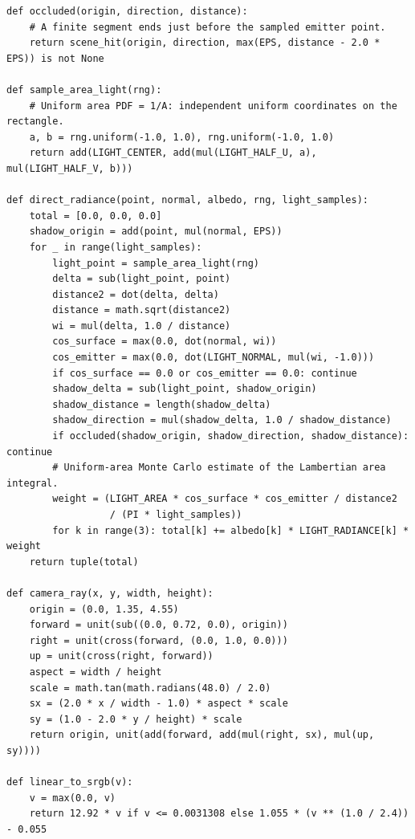 \begin{verbatim}
def occluded(origin, direction, distance):
    # A finite segment ends just before the sampled emitter point.
    return scene_hit(origin, direction, max(EPS, distance - 2.0 * EPS)) is not None

def sample_area_light(rng):
    # Uniform area PDF = 1/A: independent uniform coordinates on the rectangle.
    a, b = rng.uniform(-1.0, 1.0), rng.uniform(-1.0, 1.0)
    return add(LIGHT_CENTER, add(mul(LIGHT_HALF_U, a), mul(LIGHT_HALF_V, b)))

def direct_radiance(point, normal, albedo, rng, light_samples):
    total = [0.0, 0.0, 0.0]
    shadow_origin = add(point, mul(normal, EPS))
    for _ in range(light_samples):
        light_point = sample_area_light(rng)
        delta = sub(light_point, point)
        distance2 = dot(delta, delta)
        distance = math.sqrt(distance2)
        wi = mul(delta, 1.0 / distance)
        cos_surface = max(0.0, dot(normal, wi))
        cos_emitter = max(0.0, dot(LIGHT_NORMAL, mul(wi, -1.0)))
        if cos_surface == 0.0 or cos_emitter == 0.0: continue
        shadow_delta = sub(light_point, shadow_origin)
        shadow_distance = length(shadow_delta)
        shadow_direction = mul(shadow_delta, 1.0 / shadow_distance)
        if occluded(shadow_origin, shadow_direction, shadow_distance): continue
        # Uniform-area Monte Carlo estimate of the Lambertian area integral.
        weight = (LIGHT_AREA * cos_surface * cos_emitter / distance2
                  / (PI * light_samples))
        for k in range(3): total[k] += albedo[k] * LIGHT_RADIANCE[k] * weight
    return tuple(total)

def camera_ray(x, y, width, height):
    origin = (0.0, 1.35, 4.55)
    forward = unit(sub((0.0, 0.72, 0.0), origin))
    right = unit(cross(forward, (0.0, 1.0, 0.0)))
    up = unit(cross(right, forward))
    aspect = width / height
    scale = math.tan(math.radians(48.0) / 2.0)
    sx = (2.0 * x / width - 1.0) * aspect * scale
    sy = (1.0 - 2.0 * y / height) * scale
    return origin, unit(add(forward, add(mul(right, sx), mul(up, sy))))

def linear_to_srgb(v):
    v = max(0.0, v)
    return 12.92 * v if v <= 0.0031308 else 1.055 * (v ** (1.0 / 2.4)) - 0.055


\end{verbatim}
